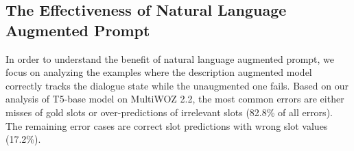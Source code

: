 \documentclass[11pt]{article}
\begin{document}
\subsection{The Effectiveness of Natural Language Augmented Prompt}
In order to understand the benefit of natural language augmented prompt, we focus on analyzing the examples where the description augmented model correctly tracks the dialogue state while the unaugmented one fails.
Based on our analysis of T5-base model on MultiWOZ 2.2, the most common errors are either misses of gold slots or
over-predictions of irrelevant slots (82.8\% of all errors). The remaining error cases are correct slot predictions with wrong slot values (17.2\%). 

\begin{comment}
\begin{table}[t]
    \small
    \centering
    \caption{Different failed modes of \textit{no desc.} models. We calculate the number of times each mode happens per turn per domain over the testing set of MultiWOZ 2.2 using T5-small experiments. \textbf{Incorrect Value Reference} stands for the slot mentions are identical between \textit{desc.} amd \textit{no desc.} but at least one of the slot value is wrong. \textbf{Fail to Mention} stands for \textit{no desc.} fails to mention at least one slot. \textbf{Mention Irrelevant} stands for \textit{no desc.} mentions at least one irrelevant slot. \textbf{\textit{no desc.}  miss. \& redundant.} stands for \textit{no desc.} fails to mention at least one slot and mentions at least one irrelevant slot at the same time.}
    \label{tab:wintype}
    \begin{tabular}{lc}
    \toprule
        \textbf{Type} & \textbf{\# (per turn, per domain)} \\
        \midrule
        \textbf{(i) Incorrect Value Reference}  &  116\\
        \textbf{(ii) Fail to Mention} & 285\\
        \textbf{(iii) Mention Irrelevant} &  267\\
        \textbf{(ii) \& (iii)} & 6 \\
        \bottomrule
    \end{tabular}
\end{table}
\end{comment}
\end{document}
